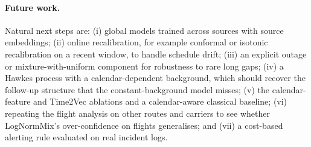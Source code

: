 \documentclass[10pt,twocolumn]{article}
\newcommand{\LNM}{LogNormMix}
\begin{document}
\paragraph{Future work.} Natural next steps are: (i) global models trained across sources with
source embeddings; (ii) online recalibration, for example conformal or isotonic recalibration on a
recent window, to handle schedule drift; (iii) an explicit outage or mixture-with-uniform component
for robustness to rare long gaps; (iv) a Hawkes process with a calendar-dependent background, which
should recover the follow-up structure that the constant-background model misses; (v) the
calendar-feature and Time2Vec ablations and a calendar-aware classical baseline; (vi) repeating the
flight analysis on other routes and carriers to see whether \LNM's over-confidence on flights
generalises; and (vii) a cost-based alerting rule evaluated on real
incident logs.

\small


\end{document}
